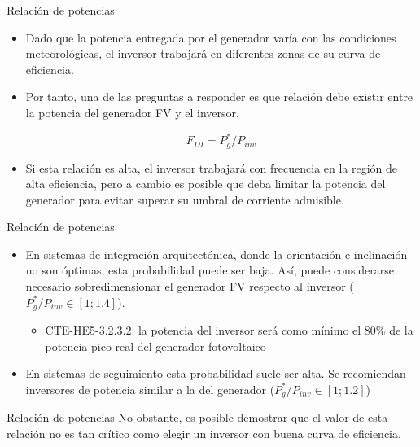 \documentclass[xcolor={usenames,svgnames,dvipsnames}]{beamer}
\begin{document}
\begin{frame}[label={sec:org1a6efd0}]{Relación de potencias}
\begin{itemize}
\item Dado que la potencia entregada por el generador varía con las condiciones meteorológicas, el inversor trabajará en diferentes zonas de su curva de eficiencia.

\item Por tanto, una de las preguntas a responder es \alert{que relación debe existir entre la potencia del generador FV y el inversor}.

\[F_{DI} = P_{g}^{*}/P_{inv}\]

\item Si esta relación es alta, el inversor trabajará con frecuencia en la región de alta eficiencia, pero a cambio es posible que deba limitar la potencia del generador para evitar superar su umbral de corriente admisible.
\end{itemize}
\end{frame}

\begin{frame}[label={sec:orgf7a6eef}]{Relación de potencias}
\begin{itemize}
\item En \alert{sistemas de integración arquitectónica}, donde la orientación e inclinación no son óptimas, esta probabilidad puede ser baja. Así, puede considerarse necesario sobredimensionar el generador FV respecto al inversor (\(P_{g}^{*}/P_{inv}\in\left[1;1.4\right]\)).

\begin{itemize}
\item CTE-HE5-3.2.3.2: \guillemotleft{}la potencia del inversor será como mínimo el 80\% de la potencia pico real del generador fotovoltaico\guillemotright{}
\end{itemize}

\item En \alert{sistemas de seguimiento} esta probabilidad suele ser alta. Se recomiendan inversores de potencia similar a la del generador  (\(P_{g}^{*}/P_{inv}\in\left[1;1.2\right]\))
\end{itemize}
\end{frame}

\begin{frame}[label={sec:org48492ed}]{Relación de potencias}
No obstante, es posible demostrar que el valor de esta relación no es tan crítico como \alert{elegir un inversor con buena curva de eficiencia}.
\end{frame}
\end{document}
